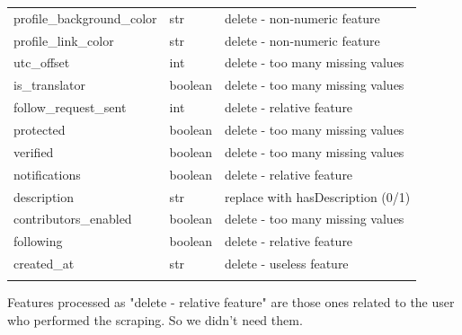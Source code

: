\begin{center}
\begin{tabular}{lll}
		profile\_background\_color&str&delete - non-numeric feature\\
		profile\_link\_color&str&delete - non-numeric feature\\
		utc\_offset&int&delete - too many missing values\\
		is\_translator&boolean&delete - too many missing values\\
		follow\_request\_sent&int&delete - relative feature\\
		protected&boolean&delete - too many missing values\\
		verified&boolean&delete - too many missing values\\
		notifications&boolean&delete - relative feature\\
		description&str&replace with hasDescription (0/1)\\
		contributors\_enabled&boolean&delete - too many missing values\\
		following&boolean&delete - relative feature\\
		created\_at&str&delete - useless feature\\\hline\\
	\end{tabular}
\end{center}
\normalsize
Features processed as "delete - relative feature" are those ones related to the user who performed the scraping. So we didn't need them.

